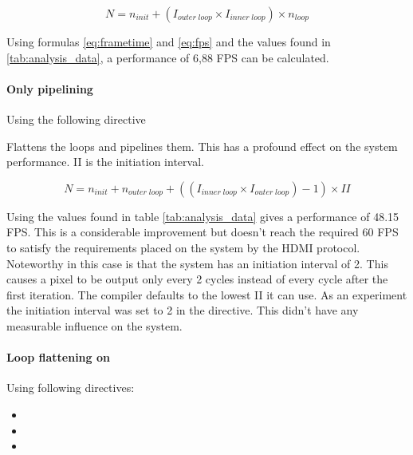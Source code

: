 \begin{equation}
N = n_{init} + (I_{outer\;loop} \times I_{inner\;loop}) \times n_{loop}
\end{equation}

\bigskip

Using formulas \ref{eq:frametime} and \ref{eq:fps} and the values found in \ref{tab:analysis_data}, a performance of 6,88 FPS can be calculated. 

\paragraph{Only pipelining} Using the following directive


Flattens the loops and pipelines them. This has a profound effect on the system performance. II is the initiation interval.


\begin{equation} \label{eq:only_pipelining}
N  = n_{init} + n_{outer\;loop} + ((I_{inner\;loop} \times I_{outer\;loop}) - 1) \times II
\end{equation}

\bigskip

Using the values found in table \ref{tab:analysis_data} gives a performance of 48.15 FPS. This is a considerable improvement but doesn't reach the required 60 FPS to satisfy the requirements placed on the system by the HDMI protocol. Noteworthy in this case is that the system has an initiation interval of 2. This causes a pixel to be output only every 2 cycles instead of every cycle after the first iteration. The compiler defaults to the lowest II it can use. As an experiment the initiation interval was set to 2 in the directive. This didn't have any measurable influence on the system.

\paragraph{Loop flattening on}
Using following directives:

\begin{itemize}
\item {}
\item {}
\item {}
\end{itemize}


